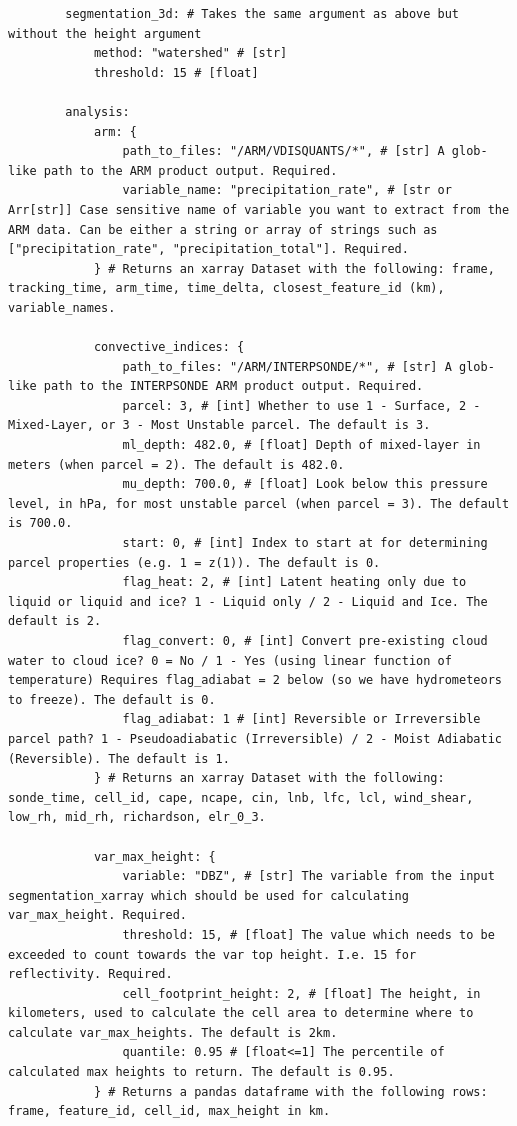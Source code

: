 \documentclass[10pt,a4paper]{article}
\begin{document}
\begin{lstlisting}
		segmentation_3d: # Takes the same argument as above but without the height argument
			method: "watershed" # [str]
			threshold: 15 # [float]
		
		analysis:
			arm: {
				path_to_files: "/ARM/VDISQUANTS/*", # [str] A glob-like path to the ARM product output. Required.
				variable_name: "precipitation_rate", # [str or Arr[str]] Case sensitive name of variable you want to extract from the ARM data. Can be either a string or array of strings such as ["precipitation_rate", "precipitation_total"]. Required.
			} # Returns an xarray Dataset with the following: frame, tracking_time, arm_time, time_delta, closest_feature_id (km), variable_names.
		
			convective_indices: {
				path_to_files: "/ARM/INTERPSONDE/*", # [str] A glob-like path to the INTERPSONDE ARM product output. Required.
				parcel: 3, # [int] Whether to use 1 - Surface, 2 - Mixed-Layer, or 3 - Most Unstable parcel. The default is 3.
				ml_depth: 482.0, # [float] Depth of mixed-layer in meters (when parcel = 2). The default is 482.0.
				mu_depth: 700.0, # [float] Look below this pressure level, in hPa, for most unstable parcel (when parcel = 3). The default is 700.0.
				start: 0, # [int] Index to start at for determining parcel properties (e.g. 1 = z(1)). The default is 0.
				flag_heat: 2, # [int] Latent heating only due to liquid or liquid and ice? 1 - Liquid only / 2 - Liquid and Ice. The default is 2.
				flag_convert: 0, # [int] Convert pre-existing cloud water to cloud ice? 0 = No / 1 - Yes (using linear function of temperature) Requires flag_adiabat = 2 below (so we have hydrometeors to freeze). The default is 0.
				flag_adiabat: 1 # [int] Reversible or Irreversible parcel path? 1 - Pseudoadiabatic (Irreversible) / 2 - Moist Adiabatic (Reversible). The default is 1.
			} # Returns an xarray Dataset with the following: sonde_time, cell_id, cape, ncape, cin, lnb, lfc, lcl, wind_shear, low_rh, mid_rh, richardson, elr_0_3.
			
			var_max_height: {
				variable: "DBZ", # [str] The variable from the input segmentation_xarray which should be used for calculating var_max_height. Required.
				threshold: 15, # [float] The value which needs to be exceeded to count towards the var top height. I.e. 15 for reflectivity. Required.
				cell_footprint_height: 2, # [float] The height, in kilometers, used to calculate the cell area to determine where to calculate var_max_heights. The default is 2km.
				quantile: 0.95 # [float<=1] The percentile of calculated max heights to return. The default is 0.95.
			} # Returns a pandas dataframe with the following rows: frame, feature_id, cell_id, max_height in km.
			

\end{lstlisting}
\end{document}
